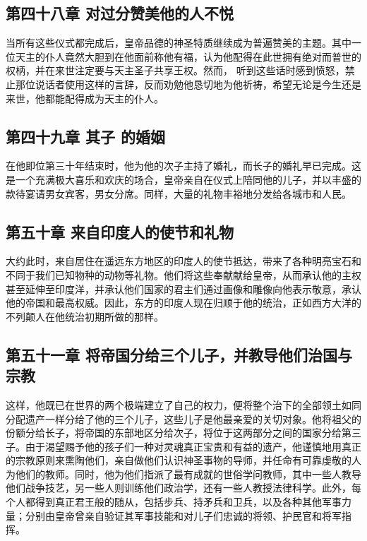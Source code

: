 \subsection{第四十八章  对过分赞美他的人不悦}

当所有这些仪式都完成后，皇帝品德的神圣特质继续成为普遍赞美的主题。其中一位天主的仆人竟然大胆到在他面前称他有福，认为他配得在此世拥有绝对而普世的权柄，并在来世注定要与天主圣子共享王权。然而， 听到这些话时感到愤怒，禁止那位说话者使用这样的言辞，反而劝勉他恳切地为他祈祷，希望无论是今生还是来世，他都能配得成为天主的仆人。\par


\subsection{第四十九章 其子  的婚姻}

在他即位第三十年结束时，他为他的次子主持了婚礼，而长子的婚礼早已完成。这是一个充满极大喜乐和欢庆的场合，皇帝亲自在仪式上陪同他的儿子，并以丰盛的款待宴请男女宾客，男女分席。同样，大量的礼物丰裕地分发给各城市和人民。\par


\subsection{第五十章 来自印度人的使节和礼物}

大约此时，来自居住在遥远东方地区的印度人的使节抵达，带来了各种明亮宝石和不同于我们已知物种的动物等礼物。他们将这些奉献献给皇帝，从而承认他的主权甚至延伸至印度洋，并承认他们国家的君主们通过画像和雕像向他表示敬意，承认他的帝国和最高权威。因此，东方的印度人现在归顺于他的统治，正如西方大洋的不列颠人在他统治初期所做的那样。\par


\subsection{第五十一章  将帝国分给三个儿子，并教导他们治国与宗教}

这样，他既已在世界的两个极端建立了自己的权力，便将整个治下的全部领土如同分配遗产一样分给了他的三个儿子，这些儿子是他最亲爱的关切对象。他将祖父的份额分给长子，将帝国的东部地区分给次子，将位于这两部分之间的国家分给第三子。由于渴望赐予他的孩子们一种对灵魂真正宝贵和有益的遗产，他谨慎地用真正的宗教原则来熏陶他们，亲自做他们认识神圣事物的导师，并任命有可靠虔敬的人为他们的教师。同时，他为他们指派了最有成就的世俗学问教师，其中一些人教导他们战争技艺，另一些人则训练他们政治学，还有一些人教授法律科学。此外，每个人都得到真正君王般的随从，包括步兵、持矛兵和卫兵，以及各种其他军事力量；分别由皇帝曾亲自验证其军事技能和对儿子们忠诚的将领、护民官和将军指挥。\par

